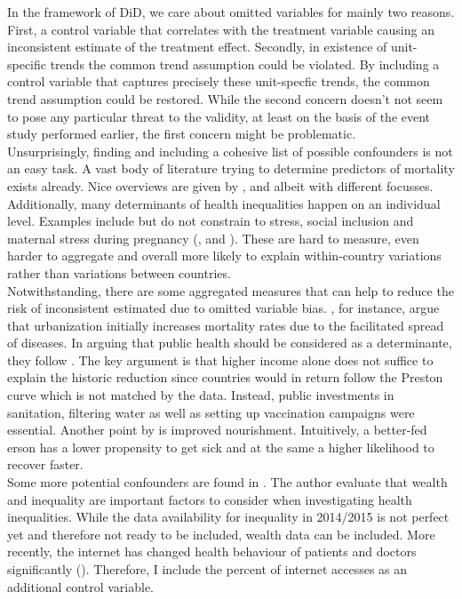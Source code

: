 \documentclass{article}
\begin{document}
In the framework of DiD, we care about omitted variables for mainly two reasons. First, a control variable that correlates with the treatment variable causing an inconsistent estimate of the treatment effect. Secondly, in existence of unit-specific trends the common trend assumption could be violated. By including a control variable that captures precisely these unit-specfic trends, the common trend assumption could be restored. While the second concern doesn't not seem to pose any particular threat to the validity, at least on the basis of the event study performed earlier, the first concern might be problematic.\\
Unsurprisingly, finding and including a cohesive list of possible confounders is not an easy task. A vast body of literature trying to determine predictors of mortality exists already. Nice overviews are given by \cite{cutler2006determinants}, \cite{soares2007determinants} and \cite{arcaya2015inequalities} albeit with different focusses. Additionally, many determinants of health inequalities happen on an individual level. Examples include but do not constrain to stress, social inclusion and 
maternal stress during pregnancy (\cite{thoits2010stress}, \cite{cohen2004social} and \cite{almond2011killing}). These are hard to measure, even harder to aggregate and overall more likely to explain within-country variations rather than variations between countries. \\
Notwithstanding, there are some aggregated measures that can help to reduce the risk of inconsistent estimated due to omitted variable bias. \cite{cutler2006determinants}, for instance, argue that urbanization initially increases mortality rates due to the facilitated spread of diseases. In arguing that public health should be considered as a determinante, they follow \cite{preston1975changing}. The key argument is that higher income alone does not suffice to explain the historic reduction since countries would in return follow the Preston curve which is not matched by the data. Instead, public investments in sanitation, filtering water as well as setting up vaccination campaigns were essential. Another point by \cite{cutler2006determinants} is improved nourishment. Intuitively, a better-fed erson has a lower propensity to get sick and at the same a higher likelihood to recover faster.\\
Some more potential confounders are found in \cite{marmot2005social}. The author evaluate that wealth and inequality are important factors to consider when investigating health inequalities. While the data availability for inequality in 2014/2015 is not perfect yet and therefore not ready to be included, wealth data can be included. More recently, the internet has changed health behaviour of patients and doctors significantly (\cite{cook2008internet}). Therefore, I include the percent of internet accesses as an additional control variable.\\
\end{document}
